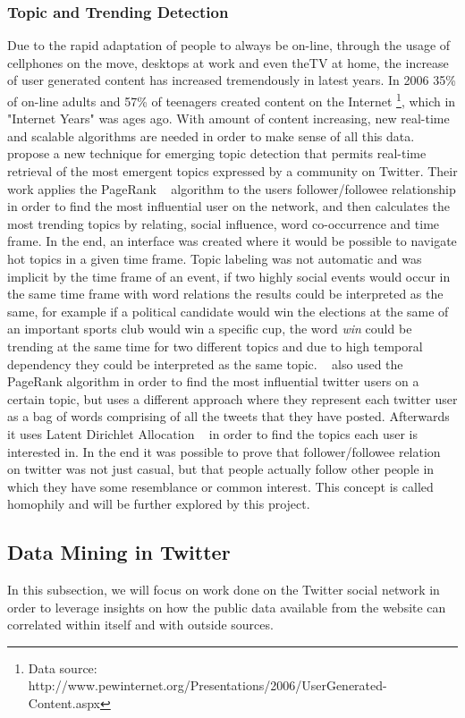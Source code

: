 \subsubsection{Topic and Trending Detection} 
\label{ssub:real_time_topic_and_trending_detection}
Due to the rapid adaptation of people to always be on-line, through the usage of cellphones on the move, desktops at work and even theTV at home, the increase of user generated content has increased tremendously in latest years. In 2006 35\% of on-line adults and 57\% of teenagers created content on the Internet \footnote{ Data source: http://www.pewinternet.org/Presentations/2006/UserGenerated-Content.aspx}, which in "Internet Years" was ages ago.
With amount of content increasing, new real-time and scalable algorithms are needed in order to make sense of all this data.
~\citet{Cataldi2010} propose a new technique for emerging topic detection that permits real-time retrieval of the most emergent topics expressed by a community on Twitter. Their work applies the PageRank ~\cite{Pagerank1998} algorithm to the users follower/followee relationship in order to find the most influential user on the network, and then calculates the most trending topics by relating, social influence, word co-occurrence and time frame. In the end, an interface was created where it would be possible to navigate hot topics in a given time frame. Topic labeling was not automatic and was implicit by the time frame of an event, if two highly social events would occur in the same time frame with word relations the results could be interpreted as the same, for example if a political candidate would win the elections at the same of an important sports club would win a specific cup, the word \emph{win} could be trending at the same time for two different topics and due to high temporal dependency they could be interpreted as the same topic.
~\citet{Weng2010} also used the PageRank algorithm in order to find the most influential twitter users on a certain topic, but uses a different approach where they represent each twitter user as a bag of words comprising of all the tweets that they have posted. Afterwards it uses Latent Dirichlet Allocation ~\cite{Blei2003} in order to find the topics each user is interested in. In the end it was possible to prove that follower/followee relation on twitter was not just casual, but that people actually follow other people in which they have some resemblance or common interest. This concept is called homophily and will be further explored by this project.

\subsection{Data Mining in Twitter } 
\label{sub:data_mining_in_twitter_}
In this subsection, we will focus on work done on the Twitter social network in order to leverage insights on how the public data available from the website can correlated within itself and with outside sources. 

